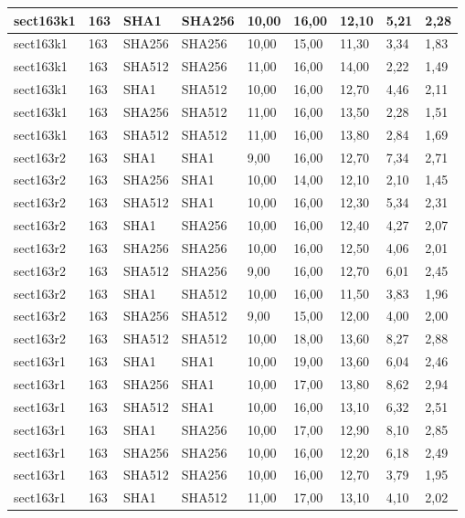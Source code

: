 \begin{longtable}{| l | l | l | l | l |l |l |l |l |}
sect163k1 & 163 & SHA1 & SHA256 & 10,00 & 16,00 & 12,10 & 5,21 & 2,28 \\ \hline 
sect163k1 & 163 & SHA256 & SHA256 & 10,00 & 15,00 & 11,30 & 3,34 & 1,83 \\ \hline 
sect163k1 & 163 & SHA512 & SHA256 & 11,00 & 16,00 & 14,00 & 2,22 & 1,49 \\ \hline 
sect163k1 & 163 & SHA1 & SHA512 & 10,00 & 16,00 & 12,70 & 4,46 & 2,11 \\ \hline 
sect163k1 & 163 & SHA256 & SHA512 & 11,00 & 16,00 & 13,50 & 2,28 & 1,51 \\ \hline 
sect163k1 & 163 & SHA512 & SHA512 & 11,00 & 16,00 & 13,80 & 2,84 & 1,69 \\ \hline 
sect163r2 & 163 & SHA1 & SHA1 & 9,00 & 16,00 & 12,70 & 7,34 & 2,71 \\ \hline 
sect163r2 & 163 & SHA256 & SHA1 & 10,00 & 14,00 & 12,10 & 2,10 & 1,45 \\ \hline 
sect163r2 & 163 & SHA512 & SHA1 & 10,00 & 16,00 & 12,30 & 5,34 & 2,31 \\ \hline 
sect163r2 & 163 & SHA1 & SHA256 & 10,00 & 16,00 & 12,40 & 4,27 & 2,07 \\ \hline 
sect163r2 & 163 & SHA256 & SHA256 & 10,00 & 16,00 & 12,50 & 4,06 & 2,01 \\ \hline 
sect163r2 & 163 & SHA512 & SHA256 & 9,00 & 16,00 & 12,70 & 6,01 & 2,45 \\ \hline 
sect163r2 & 163 & SHA1 & SHA512 & 10,00 & 16,00 & 11,50 & 3,83 & 1,96 \\ \hline 
sect163r2 & 163 & SHA256 & SHA512 & 9,00 & 15,00 & 12,00 & 4,00 & 2,00 \\ \hline 
sect163r2 & 163 & SHA512 & SHA512 & 10,00 & 18,00 & 13,60 & 8,27 & 2,88 \\ \hline 
sect163r1 & 163 & SHA1 & SHA1 & 10,00 & 19,00 & 13,60 & 6,04 & 2,46 \\ \hline 
sect163r1 & 163 & SHA256 & SHA1 & 10,00 & 17,00 & 13,80 & 8,62 & 2,94 \\ \hline 
sect163r1 & 163 & SHA512 & SHA1 & 10,00 & 16,00 & 13,10 & 6,32 & 2,51 \\ \hline 
sect163r1 & 163 & SHA1 & SHA256 & 10,00 & 17,00 & 12,90 & 8,10 & 2,85 \\ \hline 
sect163r1 & 163 & SHA256 & SHA256 & 10,00 & 16,00 & 12,20 & 6,18 & 2,49 \\ \hline 
sect163r1 & 163 & SHA512 & SHA256 & 10,00 & 16,00 & 12,70 & 3,79 & 1,95 \\ \hline 
sect163r1 & 163 & SHA1 & SHA512 & 11,00 & 17,00 & 13,10 & 4,10 & 2,02 \\ \hline 

\end{longtable}

